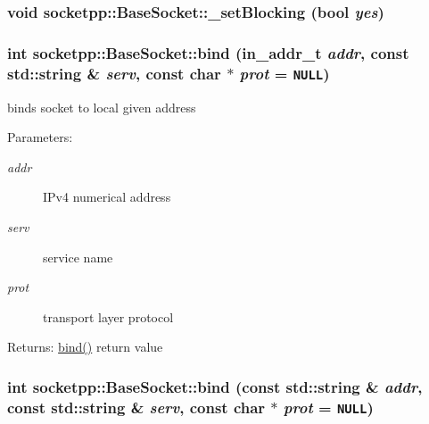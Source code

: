 \begin{CompactItemize}
\hypertarget{classsocketpp_1_1BaseSocket_4d49273453cf67218a89065bba9088c4}{
\subsubsection[{\_\-setBlocking}]{\setlength{\rightskip}{0pt plus 5cm}void socketpp::BaseSocket::\_\-setBlocking (bool {\em yes})}}
\label{classsocketpp_1_1BaseSocket_4d49273453cf67218a89065bba9088c4}


\hypertarget{classsocketpp_1_1BaseSocket_aab800bcb5ee48cd4410ae2b9ed83e23}{
\subsubsection[{bind}]{\setlength{\rightskip}{0pt plus 5cm}int socketpp::BaseSocket::bind (in\_\-addr\_\-t {\em addr}, \/  const std::string \& {\em serv}, \/  const char $\ast$ {\em prot} = {\tt NULL})}}
\label{classsocketpp_1_1BaseSocket_aab800bcb5ee48cd4410ae2b9ed83e23}


binds socket to local given address 

\begin{Desc}
\item[Parameters:]
\begin{description}
\item[{\em addr}]IPv4 numerical address \item[{\em serv}]service name \item[{\em prot}]transport layer protocol \end{description}
\end{Desc}
\begin{Desc}
\item[Returns:]\hyperlink{classsocketpp_1_1BaseSocket_78c2a8e6a5c7dfbc708c9cd637e88e51}{bind()} return value \end{Desc}
\hypertarget{classsocketpp_1_1BaseSocket_4775f13f8e1cceaaed40106162b2149f}{
\subsubsection[{bind}]{\setlength{\rightskip}{0pt plus 5cm}int socketpp::BaseSocket::bind (const std::string \& {\em addr}, \/  const std::string \& {\em serv}, \/  const char $\ast$ {\em prot} = {\tt NULL})}}
\label{classsocketpp_1_1BaseSocket_4775f13f8e1cceaaed40106162b2149f}



\end{CompactItemize}
